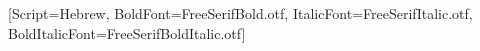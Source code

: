 \newfontfamily{}[Script=Hebrew, BoldFont=FreeSerifBold.otf, ItalicFont=FreeSerifItalic.otf, BoldItalicFont=FreeSerifBoldItalic.otf]
\newcommand\CortexHe[1]{{\CortexHebrew#1}}
